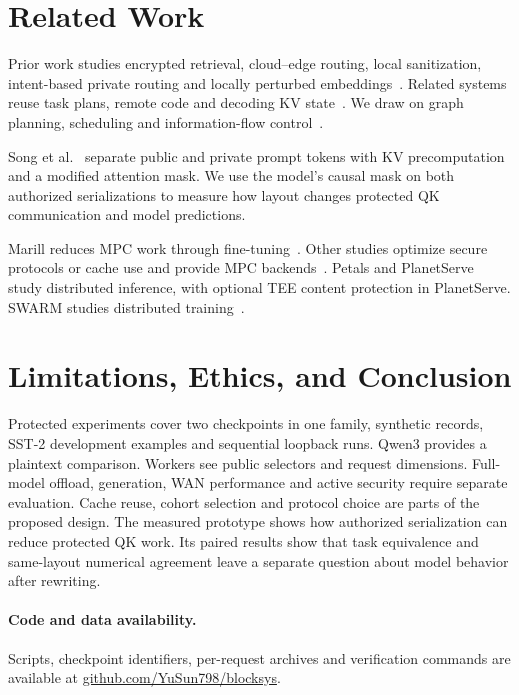 \documentclass[runningheads]{llncs}
\begin{document}
\section{Related Work}
Prior work studies encrypted retrieval, cloud--edge routing, local
sanitization, intent-based private routing and locally perturbed
embeddings~\cite{ppmi,prism,minim,agenticppml,splitdenoise}. Related systems
reuse task plans, remote code and decoding KV state~\cite{apc,collab,relaycache}.
We draw on graph planning, scheduling and information-flow
control~\cite{compiler,egg,heft,sabelfeld,cocoon}.

Song et al.~\cite{promptseparation} separate public and private prompt
tokens with KV precomputation and a modified attention mask. We use the
model's causal mask on both authorized serializations to measure how
layout changes protected QK communication and model predictions.

Marill reduces MPC work through fine-tuning~\cite{marill}. Other studies
optimize secure protocols or cache use and provide MPC
backends~\cite{bolt,puma,secretflow,mpspdz,soal,fusefss,blb,mpcache}. Petals
and PlanetServe study distributed inference, with optional TEE content
protection in PlanetServe. SWARM studies distributed
training~\cite{petals,planetserve,swarm}.

\section{Limitations, Ethics, and Conclusion}
Protected experiments cover two checkpoints in one family, synthetic
records, SST-2 development examples and sequential loopback runs.
Qwen3 provides a plaintext comparison. Workers see public selectors and
request dimensions. Full-model offload, generation,
WAN performance and active security require separate evaluation. Cache
reuse, cohort selection and protocol choice are parts of the proposed
design. The measured prototype shows how authorized serialization can
reduce protected QK work. Its paired results show that task equivalence
and same-layout numerical agreement leave a separate question about
model behavior after rewriting.

\paragraph{Code and data availability.}
Scripts, checkpoint identifiers, per-request archives and verification
commands are available at
\href{https://github.com/YuSun798/blocksys}{github.com/YuSun798/blocksys}.
\end{document}

